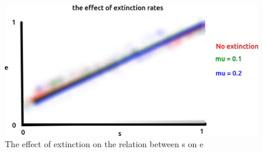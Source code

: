 \begin{figure}[!htbp]
  \includegraphics[width=\textwidth]{razzo-figures/fig_2.png}
  \caption{
    The effect of extinction on the relation between s on e
  }
  \label{fig:2}
\end{figure}